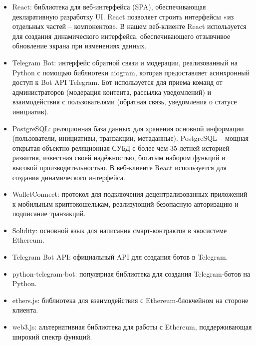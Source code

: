 \documentclass[
    14pt,
    specialist,
    candidate, %
    subf, %
    href,
    dotsinheaders=false
]{disser}
\begin{document}
\begin{itemize}
  \item React: библиотека для веб-интерфейса (SPA), обеспечивающая декларативную разработку UI. React позволяет строить интерфейсы «из отдельных частей – компонентов». В нашем веб-клиенте React используется для создания динамического интерфейса, обеспечивающего отзывчивое обновление экрана при изменениях данных. \cite{docs_react_2025}

  \item Telegram Bot: интерфейс обратной связи и модерации, реализованный на Python с помощью библиотеки aiogram, которая предоставляет асинхронный доступ к Bot API Telegram. Бот используется для приема команд от администраторов (модерация контента, рассылка уведомлений) и взаимодействия с пользователями (обратная связь, уведомления о статусе инициатив). \cite{aiogram_docs_2025}


  \item PostgreSQL: реляционная база данных для хранения основной информации (пользователи, инициативы, транзакции, метаданные). PostgreSQL – мощная открытая объектно-реляционная СУБД с более чем 35-летней историей развития, известная своей надёжностью, богатым набором функций и высокой производительностью. В веб-клиенте React используется для создания динамического интерфейса. \cite{docs_postgresql_2025}


  \item WalletConnect: протокол для подключения децентрализованных приложений к мобильным криптокошелькам, реализующий безопасную авторизацию и подписание транзакций. \cite{docs_walletconnect_2025}

  \item Solidity: основной язык для написания смарт-контрактов в экосистеме Ethereum. \cite{docs_solidity_2025}

  \item Telegram Bot API: официальный API для создания ботов в Telegram. \cite{docs_telegram_bot_api_2025}

  \item python-telegram-bot: популярная библиотека для создания Telegram-ботов на Python. \cite{docs_python_telegram_bot_2025}

  \item ethers.js: библиотека для взаимодействия с Ethereum-блокчейном на стороне клиента. \cite{docs_ethersjs_2025}

  \item web3.js: альтернативная библиотека для работы с Ethereum, поддерживающая широкий спектр функций. \cite{docs_web3js_2025}


\end{itemize}
\end{document}
